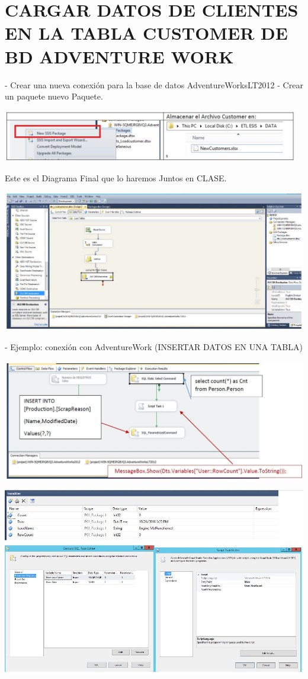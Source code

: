 \section{CARGAR DATOS DE CLIENTES EN LA TABLA CUSTOMER DE BD ADVENTURE WORK} 

- Crear una nueva conexión para la base de datos AdventureWorksLT2012
- Crear un paquete nuevo Paquete.

	\begin{center}
	\includegraphics[width=13cm]{./Imagenes/22}
	\end{center}	

Este es el Diagrama Final que lo haremos Juntos en CLASE.

	\begin{center}
	\includegraphics[width=17cm]{./Imagenes/23}
	\end{center}	

- Ejemplo: conexión con AdventureWork (INSERTAR DATOS EN UNA TABLA)

	\begin{center}
	\includegraphics[width=17cm]{./Imagenes/24}
	\end{center}	

	\begin{center}
	\includegraphics[width=17cm]{./Imagenes/25}
	\end{center}	